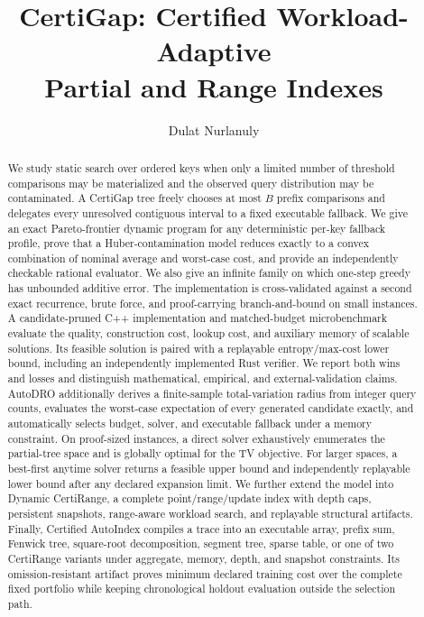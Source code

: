 \documentclass[10pt]{article}
\title{CertiGap: Certified Workload-Adaptive\\Partial and Range Indexes}
\author{Dulat Nurlanuly}
\date{}
\begin{document}
\maketitle

\begin{abstract}
We study static search over ordered keys when only a limited number of
threshold comparisons may be materialized and the observed query distribution
may be contaminated. A CertiGap tree freely chooses at most $B$ prefix
comparisons and delegates every unresolved contiguous interval to a fixed
executable fallback. We give an exact Pareto-frontier dynamic program for any
deterministic per-key fallback profile, prove that a Huber-contamination model
reduces exactly to a convex combination of nominal average and worst-case
cost, and provide an independently checkable rational evaluator. We also give
an infinite family on which one-step greedy has unbounded additive error.
The implementation is cross-validated against a second exact recurrence,
brute force, and proof-carrying branch-and-bound on small instances. A
candidate-pruned C++ implementation and matched-budget microbenchmark evaluate
the quality, construction cost, lookup cost, and auxiliary memory of scalable
solutions. Its feasible solution is paired with a replayable entropy/max-cost
lower bound, including an independently implemented Rust verifier. We report
both wins and losses and distinguish mathematical,
empirical, and external-validation claims. AutoDRO additionally derives a
finite-sample total-variation radius from integer query counts, evaluates the
worst-case expectation of every generated candidate exactly, and automatically
selects budget, solver, and executable fallback under a memory constraint. On
proof-sized instances, a direct solver exhaustively enumerates the partial-tree
space and is globally optimal for the TV objective. For larger spaces, a
best-first anytime solver returns a feasible upper bound and independently
replayable lower bound after any declared expansion limit. We further extend
the model into Dynamic CertiRange, a complete point/range/update index with
depth caps, persistent snapshots, range-aware workload search, and replayable
structural artifacts.
Finally, Certified AutoIndex compiles a trace into an executable array,
prefix sum, Fenwick tree, square-root decomposition, segment tree, sparse
table, or one of two CertiRange variants under aggregate, memory, depth, and
snapshot constraints. Its omission-resistant artifact
proves minimum declared training cost over the complete fixed portfolio while
keeping chronological holdout evaluation outside the selection path.

\end{abstract}
\end{document}
